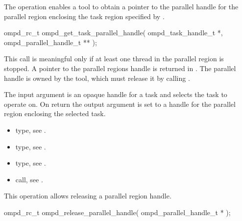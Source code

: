 \label{subsubsubsec:ompd_get_task_parallel_handle}
\summary
The    operation enables a tool to obtain a
pointer to the parallel handle for the parallel region enclosing the task region specified by
.

\format

\begin{cspecific}
\begin{ompSyntax}
ompd_rc_t ompd_get_task_parallel_handle(
  ompd_task_handle_t *,
  ompd_parallel_handle_t **
);
\end{ompSyntax}
\end{cspecific}


\descr
This call is meaningful only if at least one thread in the parallel region is stopped.
A pointer to the parallel regions handle is returned in .
The parallel handle is owned by the
tool, which must release it by calling .

\argdesc
The input argument  is an opaque handle for a task and selects the task to operate on.
On return the output argument  is set to a handle for the parallel region
enclosing the selected task.

\crossreferences
\begin{itemize}
	\item {} type, see .
	\item {} type, see .
	\item {} type, see .
	\item {} call, see 
	.
\end{itemize}

\label{subsubsubsec:ompd_release_parallel_handle}
\summary
This operation allows releasing a parallel region handle.

\format

\begin{cspecific}
\begin{ompSyntax}
ompd_rc_t ompd_release_parallel_handle(
  ompd_parallel_handle_t *
);
\end{ompSyntax}
\end{cspecific}


